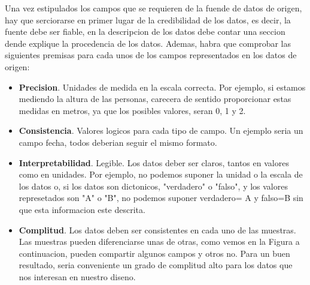 Una vez estipulados los campos que se requieren de la fuende de datos de origen, hay que serciorarse en primer lugar de la credibilidad
de los datos, es decir, la fuente debe ser fiable, en la descripcion de los datos debe contar una seccion dende explique la procedencia
de los datos. Ademas, habra que comprobar las siguientes premisas para cada unos de los campos representados en los datos de origen:
    \begin{itemize}
        \item \textbf{Precision}. Unidades de medida en la escala correcta. Por ejemplo, si estamos mediendo la altura
        de las personas, carecera de sentido proporcionar estas medidas en metros, ya que los posibles valores, seran 0, 1 y 2.
        \item \textbf{Consistencia}. Valores logicos para cada tipo de campo. Un ejemplo seria un campo fecha, todos deberian
        seguir el mismo formato.
        \item \textbf{Interpretabilidad}. Legible. Los datos deber ser claros, tantos en valores como en unidades. Por ejemplo, no podemos
        suponer la unidad o la escala de los datos o, si los datos son dictonicos, "verdadero" o "falso", y los valores represetados son 
        "A" o "B", no podemos suponer verdadero= A y falso=B sin que esta informacion este descrita. 
        \item \textbf{Complitud}. Los datos deben ser consistentes en cada uno de las muestras. Las muestras pueden diferenciarse
        unas de otras, como vemos en la Figura  a continuacion, pueden compartir algunos campos y otros no. Para un buen resultado, seria 
        conveniente un grado de complitud alto para los datos que nos interesan en nuestro diseno.
    \end{itemize}

